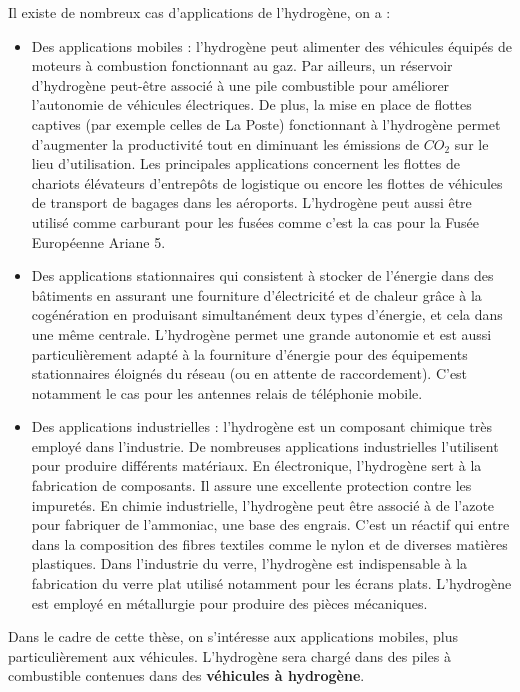  Il existe de nombreux cas d'applications de l'hydrogène, on a :
 \begin{itemize}[label=$\square$]
 
 \item Des applications  mobiles : l'hydrogène peut alimenter des véhicules équipés de moteurs à combustion fonctionnant au gaz. Par ailleurs, un réservoir d'hydrogène peut-être associé à une pile combustible pour améliorer l'autonomie de véhicules électriques. De plus, la mise en place de flottes captives (par exemple celles de La Poste) fonctionnant à l'hydrogène permet d'augmenter la productivité tout en diminuant les émissions de $CO_2$ sur le lieu d'utilisation. 
 Les principales applications concernent les flottes de chariots élévateurs d'entrepôts de logistique ou encore les flottes de véhicules de transport de bagages dans les aéroports. L'hydrogène peut aussi être utilisé comme carburant pour les fusées comme c'est la cas pour la Fusée Européenne Ariane 5.
 \item Des applications  stationnaires qui consistent à stocker de l'énergie dans des bâtiments en assurant une fourniture d'électricité et de chaleur grâce à la cogénération en produisant simultanément deux types d'énergie, et cela dans une même centrale. L'hydrogène permet une grande autonomie et est aussi particulièrement adapté à la fourniture d'énergie pour des équipements stationnaires éloignés du réseau (ou en attente de raccordement). C'est notamment le cas pour les antennes relais de téléphonie mobile.
 \item  Des applications industrielles : l'hydrogène est un composant chimique très employé dans l'industrie. De nombreuses applications industrielles l'utilisent pour produire différents matériaux.
 En électronique, l'hydrogène sert à la fabrication de composants. Il assure une excellente protection contre les impuretés.
 En chimie industrielle, l'hydrogène peut être associé à de l'azote pour fabriquer de l'ammoniac, une base des engrais. C'est un réactif qui entre dans la composition des fibres textiles comme le nylon et de diverses matières plastiques.
  Dans l'industrie du verre, l'hydrogène est indispensable à la fabrication du verre plat utilisé notamment pour les écrans plats.
 L'hydrogène est employé en métallurgie pour produire des pièces mécaniques.
 
 \end{itemize}
 
 
  Dans le cadre de cette thèse, on s'intéresse aux applications  mobiles, plus particulièrement aux véhicules. L'hydrogène sera chargé dans des piles à combustible contenues dans des \textbf{véhicules à hydrogène}. 

